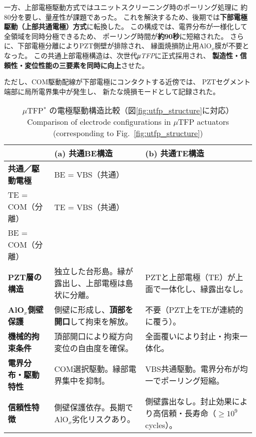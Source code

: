 \documentclass[conference]{IEEEtran}
\begin{document}
一方、上部電極駆動方式ではユニットスクリーニング時のポーリング処理に
約80分を要し、量産性が課題であった。
これを解決するため、後期では\textbf{下部電極駆動（上部共通電極）方式}に転換した。
この構成では、電界分布が一様化して全領域を同時分極できるため、
ポーリング時間が\textbf{約90秒}に短縮された。
さらに、下部電極分離によりPZT側壁が排除され、
縁面焼損防止用AlO$_x$膜が不要となった。
この共通上部電極構造は、次世代\textit{μTFP}に正式採用され、
\textbf{製造性・信頼性・変位性能の三要素を同時に向上}させた。

ただし、COM駆動配線が下部電極にコンタクトする近傍では、
PZTセグメント端部に局所電界集中が発生し、
新たな焼損モードとして記録された。

\begin{table}[!t]
\centering
\caption{%
$\mu$TFP$^\ast$ の電極駆動構造比較（図\ref{fig:utfp_structure}に対応）\\
Comparison of electrode configurations in $\mu$TFP actuators (corresponding to Fig.~\ref{fig:utfp_structure})
}
\label{tab:utfp_structure}
\renewcommand{\arraystretch}{1.15}
\setlength{\tabcolsep}{2.4pt}
\footnotesize
\begin{tabular}{@{}p{2.8cm}p{3.2cm}p{3.2cm}@{}}
\toprule
 & \textbf{(a) 共通BE構造} & \textbf{(b) 共通TE構造} \\ \midrule
\textbf{共通／駆動電極} &
BE = VBS（共通）\\
TE = COM（分離） &
TE = VBS（共通）\\
BE = COM（分離） \\[3pt]

\textbf{PZT層の構造} &
独立した台形島。縁が露出し、上部電極は島状に分離。 &
PZTと上部電極（TE）が上面で一体化し、縁露出なし。 \\[3pt]

\textbf{AlO$_x$側壁保護} &
側壁に形成し、\textbf{頂部を開口}して拘束を解放。 &
不要（PZT上をTEが連続的に覆う）。 \\[3pt]

\textbf{機械的拘束条件} &
頂部開口により縦方向変位の自由度を確保。 &
全面覆いにより封止・拘束一体化。 \\[3pt]

\textbf{電界分布・駆動特性} &
COM選択駆動。縁部電界集中を抑制。 &
VBS共通駆動。電界分布が均一でポーリング短縮。 \\[3pt]

\textbf{信頼性特徴} &
側壁保護依存。長期でAlO$_x$劣化リスクあり。 &
側壁露出なし。封止効果により高信頼・長寿命（$\ge 10^9$ cycles）。 \\[3pt]


\end{tabular}
\end{table}
\end{document}
